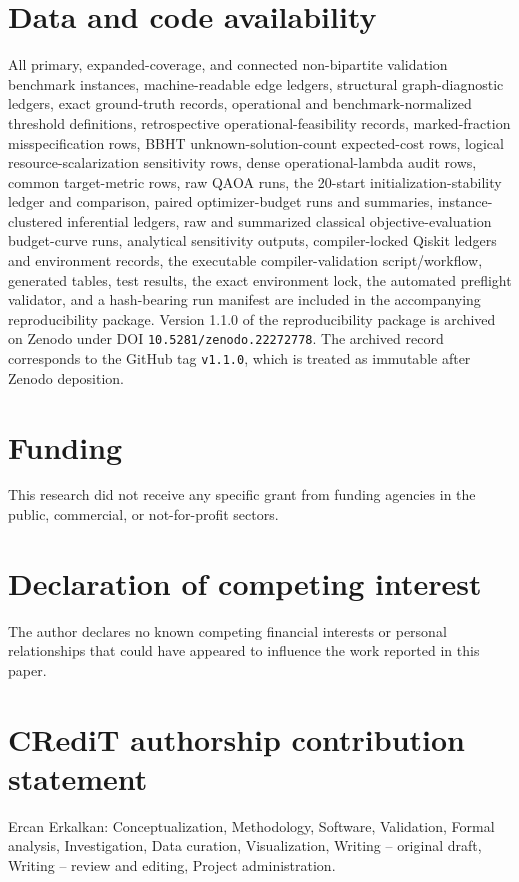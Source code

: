 \documentclass[5p,times]{elsarticle}
\begin{document}
\section*{Data and code availability}
All primary, expanded-coverage, and connected non-bipartite validation benchmark instances, machine-readable edge ledgers, structural graph-diagnostic ledgers, exact ground-truth records, operational and benchmark-normalized threshold definitions, retrospective operational-feasibility records, marked-fraction misspecification rows, BBHT unknown-solution-count expected-cost rows, logical resource-scalarization sensitivity rows, dense operational-lambda audit rows, common target-metric rows, raw QAOA runs, the 20-start initialization-stability ledger and comparison, paired optimizer-budget runs and summaries, instance-clustered inferential ledgers, raw and summarized classical objective-evaluation budget-curve runs, analytical sensitivity outputs, compiler-locked Qiskit ledgers and environment records, the executable compiler-validation script/workflow, generated tables, test results, the exact environment lock, the automated preflight validator, and a hash-bearing run manifest are included in the accompanying reproducibility package.
Version 1.1.0 of the reproducibility package is archived on Zenodo under DOI \texttt{10.5281/zenodo.22272778}. The archived record corresponds to the GitHub tag \texttt{v1.1.0}, which is treated as immutable after Zenodo deposition.

\section*{Funding}
This research did not receive any specific grant from funding agencies in the public, commercial, or not-for-profit sectors.

\section*{Declaration of competing interest}
The author declares no known competing financial interests or personal relationships that could have appeared to influence the work reported in this paper.

\section*{CRediT authorship contribution statement}
Ercan Erkalkan: Conceptualization, Methodology, Software, Validation, Formal analysis, Investigation, Data curation, Visualization, Writing -- original draft, Writing -- review and editing, Project administration.
\end{document}
